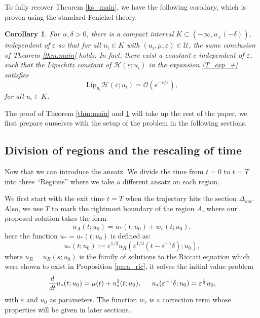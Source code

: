 \documentclass[letterpaper,11pt]{article}
\newcommand{\rmO}{\mathcal{O}}
\newcommand{\eps}{\varepsilon}
\numberwithin{equation}{section}
\theoremstyle{plain}
\newtheorem{corollary}[theorem]{Corollary}
\begin{document}
To fully recover Theorem \ref{ks_main}, we have  the following corollary, which is proven using the standard Fenichel theory.
\begin{corollary}\label{cor:main}
For $\alpha,\delta>0$, there is a compact interval $K \subset (-\infty, u_+(-\delta))$, independent of $\eps$ so that for all $u_i \in K$ with $(u_i,\mu,\eps) \in \mathcal{U}$, the same conclusion of Theorem \ref{thm:main} holds. In fact, there exist a constant $c$ independent of $\eps$, such that the Lipschitz constant of $\mathcal{H}(\eps;u_i)$ in the expansion \eqref{T_exp_+} satisfies
\begin{equation}\label{T_remainder_exp_+}
\text{Lip}_{u_i} \mathcal{H}(\eps;u_i) = \rmO(e^{-c/\eps}),
\end{equation}
for all $u_i \in K$.
\end{corollary}

 The proof of Theorem \ref{thm:main} and \ref{cor:main} will take up the rest of the paper,  we first prepare ourselves with the setup of the problem in the following sections.

\subsection{Division of regions and the rescaling of time}\label{t_sigma}
Now that we can introduce the ansatz. We divide the time from $t=0$ to $t=T$ into three ``Regions'' where we take a different ansatz on each region. 

We first start with the exit time $t=T$ when the trajectory hits the section $\Delta_{out}$. Also, we use $T$ to mark the rightmost boundary of the region $A$, where our proposed solution takes the form
\[
u_A(t; u_0) = u_*(t;u_0)  + w_r(t;u_0),
\]
here the function $u_* = u_*(t; u_0)$ is defined as:
\begin{equation}\label{urdef}
u_*(t; u_0) := \eps^{1/3}u_R(\eps^{1/3}(t-\eps^{-1}\delta); u_0),
\end{equation}
where $u_R=u_R(s; u_0)$ is the family of solutions to the Riccati equation which were shown to exist in Proposition \ref{para_ric}, it solves the initial value problem
\begin{equation}\label{ureq}
\frac{d}{dt}u_*(t; u_0) = \mu(t) + u_*^2(t; u_0), \hspace{0.2in} u_*(\eps^{-1}\delta; u_0) = \eps^{\frac{1}{3}} u_0,
\end{equation}
with $\eps$ and $u_0$ as parameters.  The function $w_r$ is a correction term whose properties will be given in later sections. 
\end{document}
